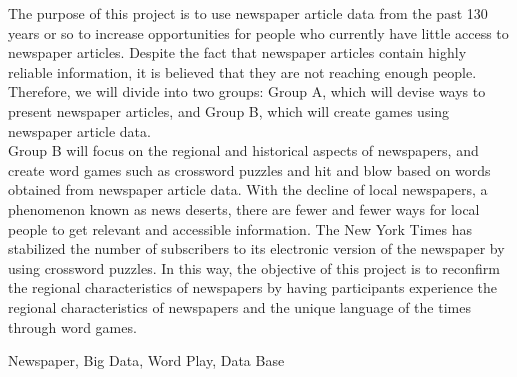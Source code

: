 \documentclass[openany, 11pt,papersize,dvipdfm]{jsbook}
\begin{document}
\begin{eabstract} The purpose of this project is to use newspaper article data from the past 130 years or so to increase opportunities for people who
currently have little access to newspaper articles. Despite the fact that newspaper articles contain highly reliable information, it is
believed that they are not reaching enough people. Therefore, we will divide into two groups: Group A, which will devise ways to
present newspaper articles, and Group B, which will create games using newspaper article data.\\
Group B will focus on the regional and historical aspects of newspapers, and create word games such as crossword puzzles and hit and blow based on words obtained from newspaper article data. With the decline of local newspapers, a phenomenon known as news deserts, there are fewer and fewer ways for local people to get relevant and accessible information. The New York Times has stabilized the number of subscribers to its electronic version of the newspaper by using crossword puzzles. In this way, the objective of this project is to reconfirm the regional characteristics of newspapers by having participants experience the regional characteristics of newspapers and the unique language of the times through word games.
\begin{ekeyword}
Newspaper, Big Data, Word Play, Data Base
\end{ekeyword}
\end{eabstract}

\tableofcontents%

\mainmatter%








\begin{appendix}


\end{appendix}

\end{document}

